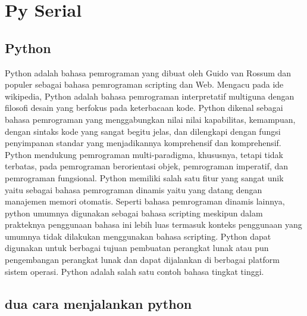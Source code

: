 \section{Py Serial}

	\subsection{Python}
	Python adalah bahasa pemrograman yang dibuat oleh Guido van Rossum dan populer sebagai bahasa pemrograman scripting dan Web. Mengacu pada ide wikipedia, Python adalah bahasa pemrograman interpretatif multiguna dengan filosofi desain yang berfokus pada keterbacaan kode. 
	Python dikenal sebagai bahasa pemrograman yang menggabungkan nilai nilai kapabilitas, kemampuan, dengan sintaks kode yang sangat begitu jelas, dan dilengkapi dengan fungsi penyimpanan standar yang menjadikannya komprehensif dan komprehensif. 
	Python mendukung pemrograman multi-paradigma, khususnya, tetapi tidak terbatas, pada pemrograman berorientasi objek, pemrograman imperatif, dan pemrograman fungsional. 
	Python memiliki salah satu fitur yang sangat unik yaitu sebagai bahasa pemrograman dinamis yaitu yang datang dengan manajemen memori otomatis. Seperti bahasa 
	pemrograman dinamis lainnya, python umumnya digunakan sebagai bahasa scripting meskipun dalam prakteknya penggunaan bahasa ini lebih luas termasuk konteks penggunaan yang umumnya tidak dilakukan menggunakan bahasa scripting. 
	Python dapat digunakan untuk berbagai tujuan pembuatan perangkat lunak atau pun pengembangan perangkat lunak dan dapat dijalankan di berbagai platform sistem operasi. Python adalah salah satu contoh bahasa tingkat tinggi. 

\subsection{dua cara menjalankan python}
  
